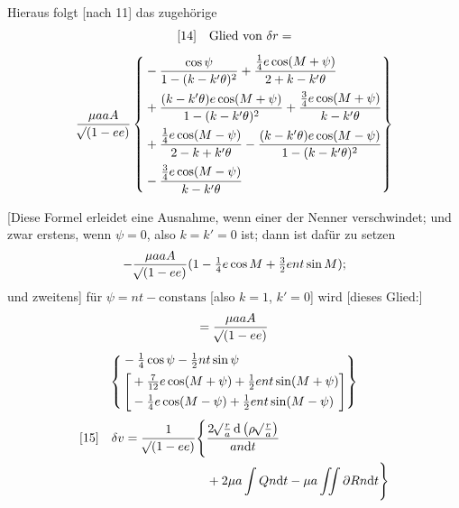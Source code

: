 Hieraus folgt [nach 11] das zugehörige
\[
\begin{gathered}
{}[14]\quad\text{Glied von }\delta r=\\[1ex]
\frac{\mu aaA}{\mathord{{}^{}\!\surd}(1-ee)}\left\{\begin{aligned}
&-\frac{\cos\psi}{1-(k-k'\theta)^2}+\frac{\tfrac14e\cos(M+\psi)}{2+k-k'\theta}\\
&+\frac{(k-k'\theta)e\cos(M+\psi)}{1-(k-k'\theta)^2}+\frac{\tfrac34e\cos(M+\psi)}{k-k'\theta}\\
&+\frac{\tfrac14e\cos(M-\psi)}{2-k+k'\theta}-\frac{(k-k'\theta)e\cos(M-\psi)}{1-(k-k'\theta)^2}\\
&-\frac{\tfrac34e\cos(M-\psi)}{k-k'\theta}
\end{aligned}\right\}
\end{gathered}
\]

[Diese Formel erleidet eine Ausnahme, wenn einer der Nenner verschwindet; und zwar erstens, wenn \(\psi=0\), also \(k=k'=0\) ist; dann ist dafür zu setzen
\[
-\frac{\mu aaA}{\mathord{{}^{}\!\surd}(1-ee)}(1-\tfrac14e\cos M+\tfrac32ent\sin M);
\]
\noindent und zweitens] für \(\psi=nt-\text{constans}\) [also \(k=1\), \(k'=0\)] wird [dieses Glied:]
\[
\begin{gathered}
=\frac{\mu aaA}{\mathord{{}^{}\!\surd}(1-ee)}\\[1ex]
\left\{\begin{aligned}
&-\tfrac14\cos\psi-\tfrac12nt\sin\psi\\
&\left[\begin{aligned}
&+\tfrac7{12}e\cos(M+\psi)+\tfrac12ent\sin(M+\psi)\\
&-\tfrac14e\cos(M-\psi)+\tfrac12ent\sin(M-\psi)
\end{aligned}\right]
\end{aligned}\right\}
\end{gathered}
\]
\[
\begin{aligned}
{}[15]\quad\delta v=\frac1{\mathord{{}^{}\!\surd}(1-ee)}\Bigg\{&\frac{2\mathord{{}^{}\!\surd}\frac ra\,\mathrm{d}\left(\rho\mathord{{}^{}\!\surd}\frac ra\right)}{an\mathrm{d}t}\\
&+2\mu a\int Qn\mathrm{d}t-\mu a\iint\partial Rn\mathrm{d}t\Bigg\}
\end{aligned}
\]


